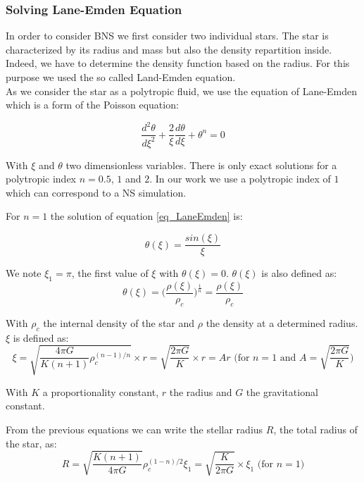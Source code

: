 \subsubsection{Solving Lane-Emden Equation}

In order to consider BNS we first consider two individual stars. 
The star is characterized by its radius and mass but also the density repartition inside.
Indeed, we have to determine the density function based on the radius. 
For this purpose we used the so called Land-Emden equation.\\

As we consider the star as a polytropic fluid, we use the equation of Lane-Emden which is a form of the Poisson equation: 

\begin{equation}\label{eq_LaneEmden}
  \frac{d^2\theta}{d \xi^2}+ \frac{2}{\xi}\frac{d\theta}{d\xi}+\theta^n = 0
\end{equation}

With $\xi$ and $\theta$ two dimensionless variables. 
There is only exact solutions for a polytropic index $n = 0.5$, $1$ and $2$.
In our work we use a polytropic index of $1$ which can correspond to a NS simulation.

For $n=1$ the solution of equation \ref{eq_LaneEmden} is: 

\begin{equation}
\theta(\xi)=\frac{sin(\xi)}{\xi}
\end{equation}

We note $\xi_1 = \pi$, the first value of $\xi$ with $\theta(\xi) = 0$.
$\theta(\xi)$ is also defined as: 
\begin{equation}
 \theta(\xi) = \Big(\frac{\rho(\xi)}{\rho_c}\Big)^{\frac{1}{n}}  = \frac{\rho(\xi)}{\rho_c}
\end{equation}

With $\rho_c$ the internal density of the star and $\rho$ the density at a determined radius. $\xi$ is defined as:  
$$ \xi = \sqrt{\frac{4\pi G}{K(n+1)}\rho_c^{(n-1)/n}} \times r = \sqrt{\frac{2\pi G}{K}}\times r = Ar\mbox{ (for } n=1 \mbox{ and } A=\sqrt{\frac{2\pi G}{K}} \mbox{)}$$

With $K$ a proportionality constant, $r$ the radius and $G$ the gravitational constant.

From the previous equations we can write the stellar radius $R$, the total radius of the star, as:
\begin{equation}
R = \sqrt{\frac{K(n+1)}{4\pi G}}\rho_c^{(1-n)/2}\xi_1 = \sqrt{ \frac{K}{2\pi G} } \times \xi_1 \mbox{ (for } n=1 \mbox{)}
\end{equation} 

